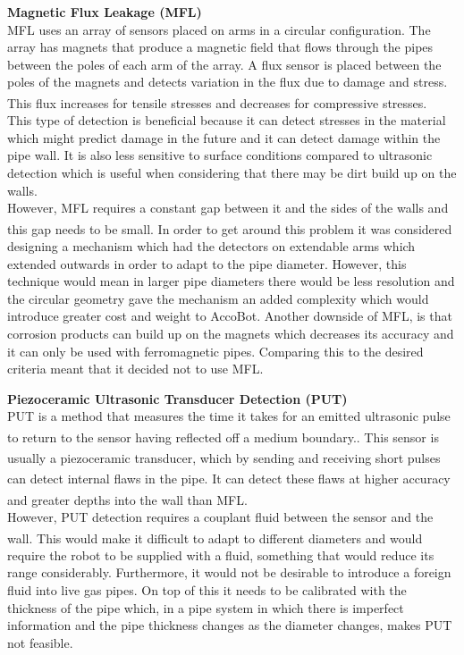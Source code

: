 \documentclass[11pt]{article}		%
\newcommand{\supercite}[1]{\textsuperscript{\cite{#1}}}		%
\begin{document}
	        \textbf{Magnetic Flux Leakage (MFL)}
	        \\
	        MFL uses an array of sensors placed on arms in a circular configuration. The array has magnets that produce a magnetic field that flows through the pipes between the poles of each arm of the array. A flux sensor is placed between the poles of the magnets and detects variation in the flux due to damage and stress. This flux increases for tensile stresses and decreases for compressive stresses.\supercite{MFL_explanation}
	        \\
            \hspace*{3ex}This type of detection is beneficial because it can detect stresses in the material which might predict damage in the future and it can detect damage within the pipe wall. It is also less sensitive to surface conditions compared to ultrasonic detection which is useful when considering that there may be dirt build up on the walls.
	        \\
            \hspace*{3ex}However, MFL requires a constant gap between it and the sides of the walls and this gap needs to be small\supercite{MFL_explanation}. In order to get around this problem it was considered designing a mechanism which had the detectors on extendable arms which extended outwards in order to adapt to the pipe diameter. However, this technique would mean in larger pipe diameters there would be less resolution and the circular geometry gave the mechanism an added complexity which would introduce greater cost and weight to AccoBot. Another downside of MFL, is that corrosion products can build up on the magnets which decreases its accuracy and it can only be used with ferromagnetic pipes. Comparing this to the desired criteria meant that it decided not to use MFL. 
            
	        \textbf{Piezoceramic Ultrasonic Transducer Detection (PUT)}
	        \\
	        PUT is a method that measures the time it takes for an emitted ultrasonic pulse to return to the sensor having reflected off a medium boundary.\supercite{UT_explanation}. This sensor is usually a piezoceramic transducer\supercite{UT}, which by sending and receiving short pulses can detect internal flaws in the pipe.\supercite{Corrosion} It can detect these flaws at higher accuracy and greater depths into the wall than MFL.\supercite{MFL_Pig}
	        \\
            \hspace*{3ex}However, PUT detection requires a couplant fluid between the sensor and the wall.\supercite{UT_explanation} This would make it difficult to adapt to different diameters and would require the robot to be supplied with a fluid, something that would reduce its range considerably. Furthermore, it would not be desirable to introduce a foreign fluid into live gas pipes. On top of this it needs to be calibrated with the thickness of the pipe which, in a pipe system in which there is imperfect information and the pipe thickness changes as the diameter changes, makes PUT not feasible.
\end{document}
